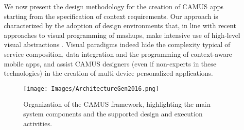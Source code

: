 \label{sec:methodology}
We now present the design methodology for the creation of CAMUS apps starting from the specification of context requirements.
Our approach is characterized by the adoption of design environments that, in line with recent approaches to visual programming of mashups, make intensive use of high-level visual abstractions \cite{DBLP:journals/vlc/ArditoCDLMPP14,journals/TWEB2015/CappielloMP15}. Visual paradigms indeed hide the complexity typical of service composition, data integration and the programming of context-aware mobile apps, and assist CAMUS designers (even if non-experts in these technologies) in the creation of multi-device personalized applications.


%
\begin{figure} [t]
\centering
\texttt{[image: Images/ArchitectureGen2016.png]}
\caption{Organization of the CAMUS framework, highlighting the main system components and the supported design and execution activities.}
\label{fig:architecture}
\end{figure}
%

